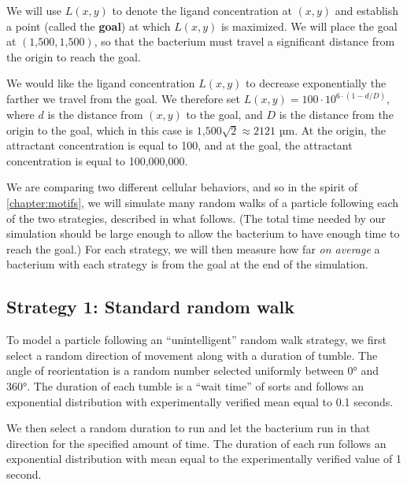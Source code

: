 We will use $L(x,y)$ to denote the ligand concentration at $(x, y)$ and establish a point (called the \textbf{goal}) at which $L(x,y)$ is maximized. We will place the goal at $(\text{1,500}, \text{1,500})$, so that the bacterium must travel a significant distance from the origin to reach the goal.

We would like the ligand concentration $L(x,y)$ to decrease exponentially the farther we travel from the goal. We therefore set $L(x,y) = 100 \cdot 10^{6 \cdot (1-d/D)}$, where $d$ is the distance from $(x, y)$ to the goal, and $D$ is the distance from the origin to the goal, which in this case is $\text{1,500}\sqrt{2} \approx 2121$ µm. At the origin, the attractant concentration is equal to 100, and at the goal, the attractant concentration is equal to 100,000,000.  \\

\begin{qbox}\end{qbox}

We are comparing two different cellular behaviors, and so in the spirit of \autoref{chapter:motifs}, we will simulate many random walks of a particle following each of the two strategies, described in what follows. (The total time needed by our simulation should be large enough to allow the bacterium to have enough time to reach the goal.) For each strategy, we will then measure how far \textit{on average} a bacterium with each strategy is from the goal at the end of the simulation.

\FloatBarrier
{}
\subsection{Strategy 1: Standard random walk}

To model a particle following an ``unintelligent'' random walk strategy, we first select a random direction of movement along with a duration of tumble. The angle of reorientation is a random number selected uniformly between 0° and 360°. The duration of each tumble is a ``wait time'' of sorts and follows an exponential distribution with experimentally verified mean equal to 0.1 seconds.

We then select a random duration to run and let the bacterium run in that direction for the specified amount of time.  The duration of each run follows an exponential distribution with mean equal to the experimentally verified value of 1 second.


